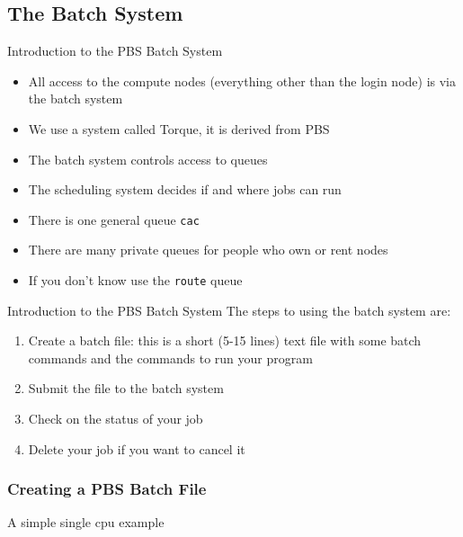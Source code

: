 \documentclass{beamer}
\begin{document}
  \subsection{The Batch System}
  \begin{frame}{Introduction to the PBS Batch System}
    \begin{itemize}
    \item All access to the compute nodes (everything other than the login node)
      is via the batch system
    \item We use a system called Torque, it is derived from PBS
    \item The batch system controls access to queues
    \item The scheduling system decides if and where jobs can run
    \item<2-> There is one general queue \texttt{cac}
    \item<2-> There are many private queues for people who own or rent nodes
    \item<2-> If you don't know use the \texttt{route} queue
    \end{itemize}
  \end{frame}
  \begin{frame}{Introduction to the PBS Batch System}
    The steps to using the batch system are:
    \begin{enumerate}
    \item Create a batch file: this is a short (5-15 lines) text file with some
      batch commands and the commands to run your program
    \item Submit the file to the batch system
    \item Check on the status of your job
    \item Delete your job if you want to cancel it
    \end{enumerate}
  \end{frame}
\begin{frame}[fragile]
  \frametitle{Creating a PBS Batch File}
A simple single cpu example
  \begin{semiverbatim}
  \end{semiverbatim}
\end{frame}
\end{document}
